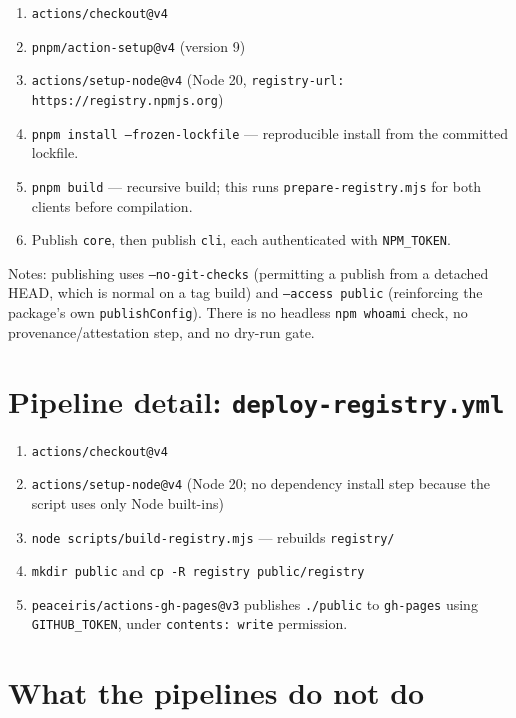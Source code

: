 \begin{enumerate}
  \item \texttt{actions/checkout@v4}
  \item \texttt{pnpm/action-setup@v4} (version 9)
  \item \texttt{actions/setup-node@v4} (Node 20, \texttt{registry-url:
        https://registry.npmjs.org})
  \item \texttt{pnpm install --frozen-lockfile} --- reproducible install from the
        committed lockfile.
  \item \texttt{pnpm build} --- recursive build; this runs
        \texttt{prepare-registry.mjs} for both clients before compilation.
  \item Publish \texttt{core}, then publish \texttt{cli}, each authenticated with
        \texttt{NPM\_TOKEN}.
\end{enumerate}

Notes: publishing uses \texttt{--no-git-checks} (permitting a publish from a
detached HEAD, which is normal on a tag build) and \texttt{--access public}
(reinforcing the package's own \texttt{publishConfig}). There is no headless
\texttt{npm whoami} check, no provenance/attestation step, and no dry-run gate.

\section{Pipeline detail: \texttt{deploy-registry.yml}}

\begin{enumerate}
  \item \texttt{actions/checkout@v4}
  \item \texttt{actions/setup-node@v4} (Node 20; no dependency install step
        because the script uses only Node built-ins)
  \item \texttt{node scripts/build-registry.mjs} --- rebuilds
        \texttt{registry/}
  \item \texttt{mkdir public} and \texttt{cp -R registry public/registry}
  \item \texttt{peaceiris/actions-gh-pages@v3} publishes \texttt{./public} to
        \texttt{gh-pages} using \texttt{GITHUB\_TOKEN}, under
        \texttt{contents: write} permission.
\end{enumerate}

\section{What the pipelines do not do}

